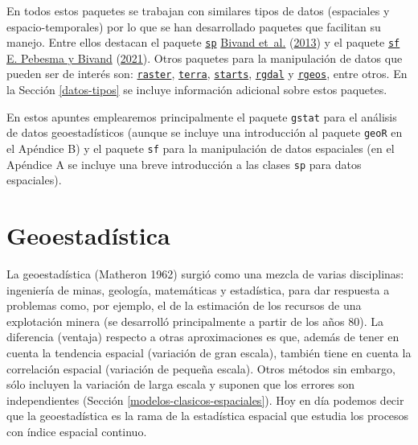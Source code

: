 \documentclass[
  spanish,
]{book}
\theoremstyle{break}
\begin{document}
En todos estos paquetes se trabajan con similares tipos de datos (espaciales y espacio-temporales) por lo que se han desarrollado paquetes que facilitan su manejo.
Entre ellos destacan el paquete \href{https://CRAN.R-project.org/package=sp}{\texttt{sp}} \protect\hyperlink{ref-Bivand2013}{Bivand et~al.} (\protect\hyperlink{ref-Bivand2013}{2013}) y el paquete \href{https://r-spatial.github.io/sf}{\texttt{sf}} \protect\hyperlink{ref-Pebesma2021}{E. Pebesma y Bivand} (\protect\hyperlink{ref-Pebesma2021}{2021}).
Otros paquetes para la manipulación de datos que pueden ser de interés son: \href{https://CRAN.R-project.org/package=raster}{\texttt{raster}}, \href{https://CRAN.R-project.org/package=terra}{\texttt{terra}}, \href{https://r-spatial.github.io/stars}{\texttt{starts}}, \href{https://CRAN.R-project.org/package=rgdal}{\texttt{rgdal}} y \href{https://CRAN.R-project.org/package=rgeos}{\texttt{rgeos}}, entre otros.
En la Sección \ref{datos-tipos} se incluye información adicional sobre estos paquetes.

En estos apuntes emplearemos principalmente el paquete \texttt{gstat} para el análisis de datos geoestadísticos (aunque se incluye una introducción al paquete \texttt{geoR} en el Apéndice B) y el paquete \texttt{sf} para la manipulación de datos espaciales (en el Apéndice A se incluye una breve introducción a las clases \texttt{sp} para datos espaciales).

\hypertarget{geoestadistica}{%
\section{Geoestadística}\label{geoestadistica}}

La geoestadística (Matheron 1962) surgió como una mezcla de varias disciplinas: ingeniería de minas, geología, matemáticas y estadística, para dar respuesta a problemas como, por ejemplo, el de la estimación de los recursos de una explotación minera (se desarrolló principalmente a partir de los años 80).
La diferencia (ventaja) respecto a otras aproximaciones es que, además de tener en cuenta la tendencia espacial (variación de gran escala), también tiene en cuenta la correlación espacial (variación de pequeña escala).
Otros métodos sin embargo, sólo incluyen la variación de larga escala y suponen que los errores son independientes (Sección \ref{modelos-clasicos-espaciales}).
Hoy en día podemos decir que la geoestadística es la rama de la estadística espacial que estudia los procesos con índice espacial continuo.
\end{document}
